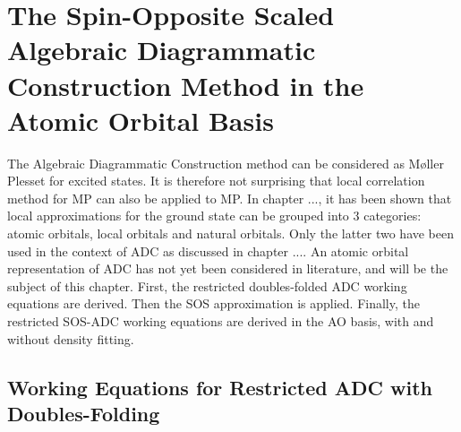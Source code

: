 \chapter{The Spin-Opposite Scaled Algebraic Diagrammatic Construction Method in the Atomic Orbital Basis \label{cha:AOADC}}

The Algebraic Diagrammatic Construction method can be considered as M{\o}ller Plesset for excited states. It is therefore not surprising that local correlation method for MP can also be applied to MP. In chapter ..., it has been shown that local approximations for the ground state can be grouped into 3 categories: atomic orbitals, local orbitals and natural orbitals. Only the latter two have been used in the context of ADC as discussed in chapter .... An atomic orbital representation of ADC has not yet been considered in literature, and will be the subject of this chapter. First, the restricted doubles-folded ADC working equations are derived. Then the SOS approximation is applied. Finally, the restricted SOS-ADC working equations are derived in the AO basis, with and without density fitting. 

\section{Working Equations for Restricted ADC with Doubles-Folding}

